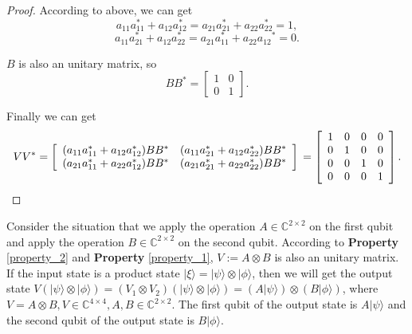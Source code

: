 \begin{proof}
According to above, we can get
\begin{equation}
a_{11} a_{11}^*+a_{12} a_{12}^*=a_{21} a_{21}^*+a_{22} a_{22}^*=1,
\end{equation}
\begin{equation}
a_{11} a_{21}^*+a_{12} a_{22}^*=a_{21}a_{11}^*+a_{22} a_{12}{ }^*=0 .
\end{equation}

$B$ is also an unitary matrix, so 
\begin{equation}
B B^*=\left[\begin{array}{ll}
1 & 0 \\
0 & 1
\end{array}\right].
\end{equation}

Finally we can get 
\begin{equation}
V V^*=\left[\begin{array}{ll}
(a_{11} a_{11}^*+a_{12} a_{12}^*)B B^* & (a_{11} a_{21}^*+a_{12} a_{22}^*)B B^* \\
(a_{21} a_{11}^*+a_{22} a_{12}^*)B B^* & (a_{21} a_{21}^* +a_{22} a_{22}^*)B B^*
\end{array}\right]\\
=\left[\begin{array}{cccc}
1 & 0 & 0 & 0 \\
0 & 1 & 0 & 0 \\
0 & 0 & 1 & 0 \\
0 & 0 & 0 & 1 \\
\end{array}\right].
\end{equation}

\end{proof}

Consider the situation that we apply the operation $A\in\mathbb{C}^{2\times2}$ on the first qubit and apply the operation $B\in\mathbb{C}^{2\times2}$ on the second qubit. According to \textbf{Property} \ref{property_2} and \textbf{Property} \ref{property_1}, $V:=A\otimes B$ is also an unitary matrix. If the input state is a product state $|\xi\rangle=|\psi\rangle\otimes|\phi\rangle$, then we will get the output state $V(|\psi\rangle\otimes|\phi\rangle)=(V_1\otimes V_2)(|\psi\rangle\otimes|\phi\rangle)=(A|\psi\rangle)\otimes(B|\phi\rangle)$, where $V=A\otimes B, V\in \mathbb{C}^{4\times4}, A, B\in \mathbb{C}^{2\times2}$. The first qubit of the output state is $A|\psi\rangle$ and the second qubit of the output state is $B|\phi\rangle$.
\vspace{0.5cm}

